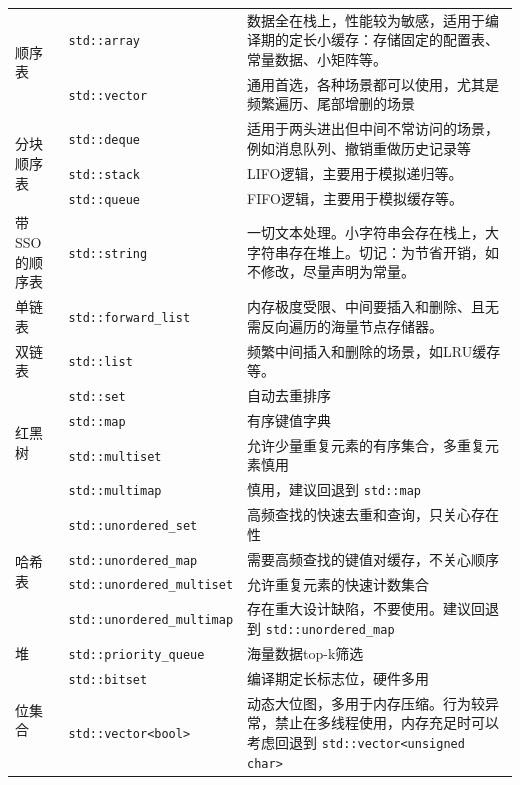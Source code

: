 \begin{longtable}[c]{l|l|p{7cm}}
    \multirow{2}{*}{顺序表} & \verb|std::array| & 数据全在栈上，性能较为敏感，适用于编译期的定长小缓存：存储固定的配置表、常量数据、小矩阵等。 \\
    & \verb|std::vector| & 通用首选，各种场景都可以使用，尤其是频繁遍历、尾部增删的场景 \\
    \midrule
    \multirow{3}{*}{分块顺序表} & \verb|std::deque| & 适用于两头进出但中间不常访问的场景，例如消息队列、撤销重做历史记录等 \\
    & \verb|std::stack| & LIFO逻辑，主要用于模拟递归等。 \\
    & \verb|std::queue| & FIFO逻辑，主要用于模拟缓存等。 \\
    \midrule
    带SSO的顺序表 & \verb|std::string| & 一切文本处理。小字符串会存在栈上，大字符串存在堆上。切记：为节省开销，如不修改，尽量声明为常量。 \\
    \midrule
    单链表 & \verb|std::forward_list| & 内存极度受限、中间要插入和删除、且无需反向遍历的海量节点存储器。 \\
    \midrule
    双链表 & \verb|std::list| & 频繁中间插入和删除的场景，如LRU缓存等。 \\
    \midrule
    \multirow{4}{*}{红黑树} & \verb|std::set| & 自动去重排序 \\
    & \verb|std::map| & 有序键值字典 \\
    & \verb|std::multiset| & 允许少量重复元素的有序集合，多重复元素慎用 \\
    & \verb|std::multimap| & 慎用，建议回退到 \verb|std::map| \\
    \midrule
    \multirow{4}{*}{哈希表} & \verb|std::unordered_set| & 高频查找的快速去重和查询，只关心存在性 \\
    & \verb|std::unordered_map| & 需要高频查找的键值对缓存，不关心顺序 \\
    & \verb|std::unordered_multiset| & 允许重复元素的快速计数集合 \\ 
    & \verb|std::unordered_multimap| & 存在重大设计缺陷，不要使用。建议回退到 \verb|std::unordered_map| \\
    \midrule
    堆 & \verb|std::priority_queue| & 海量数据top-k筛选 \\
    \midrule
    \multirow{2}{*}{位集合} & \verb|std::bitset| & 编译期定长标志位，硬件多用 \\
    & \verb|std::vector<bool>| & 动态大位图，多用于内存压缩。行为较异常，禁止在多线程使用，内存充足时可以考虑回退到 \verb|std::vector<unsigned char>| \\
\end{longtable}

